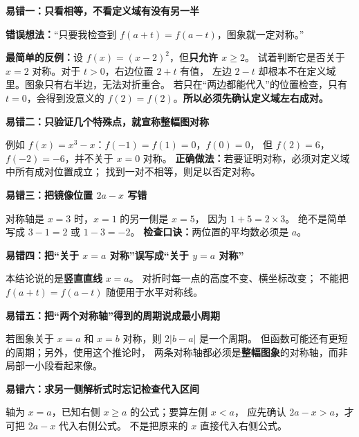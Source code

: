 \clearpage
\begin{trapbox}
  \textbf{\textcolor{CTrap}{易错一：只看相等，不看定义域有没有另一半}}


  \textbf{错误想法：}“只要我检查到 $f(a+t)=f(a-t)$，图象就一定对称。”

  \textbf{最简单的反例：}设 $f(x)=(x-2)^2$，但\textbf{只允许 $x\ge2$}。
  试着判断它是否关于 $x=2$ 对称。对于 $t>0$，右边位置 $2+t$ 有值，
  左边 $2-t$ 却根本不在定义域里。图象只有右半边，无法对折重合。
  若只在“两边都能代入”的位置检查，只有 $t=0$，会得到没意义的
  $f(2)=f(2)$。\textbf{所以必须先确认定义域左右成对。}

  \medskip
  
\end{trapbox}
\clearpage
\begin{trapbox}
\textbf{\textcolor{CTrap}{易错二：只验证几个特殊点，就宣称整幅图对称}}


  例如 $f(x)=x^3-x$：$f(-1)=f(1)=0$，$f(0)=0$，
  但 $f(2)=6$，$f(-2)=-6$，并不关于 $x=0$ 对称。
  \textbf{正确做法：}若要证明对称，必须对定义域中所有成对位置成立；
  找到一对不相等，则足以否定对称。

  \medskip
  
\end{trapbox}
\clearpage
\begin{trapbox}
\textbf{\textcolor{CTrap}{易错三：把镜像位置 $2a-x$ 写错}}


  对称轴是 $x=3$ 时，$x=1$ 的另一侧是 $x=5$，
  因为 $1+5=2\times3$。
  绝不是简单写成 $3-1=2$ 或 $1-3=-2$。
  \textbf{检查口诀：}两位置的平均数必须是 $a$。

  \medskip
  
\end{trapbox}
\clearpage
\begin{trapbox}
\textbf{\textcolor{CTrap}{易错四：把“关于 $x=a$ 对称”误写成“关于 $y=a$ 对称”}}


  本结论说的是\textbf{竖直直线} $x=a$。
  对折时每一点的高度不变、横坐标改变；
  不能把 $f(a+t)=f(a-t)$ 随便用于水平对称线。

  \medskip
  
\end{trapbox}
\clearpage
\begin{trapbox}
\textbf{\textcolor{CTrap}{易错五：把“两个对称轴”得到的周期说成最小周期}}


  若图象关于 $x=a$ 和 $x=b$ 对称，则 $2|b-a|$ 是一个周期。
  但函数可能还有更短的周期；另外，使用这个推论时，
  两条对称轴都必须是\textbf{整幅图象}的对称轴，而非局部一小段看起来像。

  \medskip
  
\end{trapbox}
\clearpage
\begin{trapbox}
\textbf{\textcolor{CTrap}{易错六：求另一侧解析式时忘记检查代入区间}}


  轴为 $x=a$，已知右侧 $x\ge a$ 的公式；要算左侧 $x<a$，
  应先确认 $2a-x>a$，才可把 $2a-x$ 代入右侧公式。
  不是把原来的 $x$ 直接代入右侧公式。
\end{trapbox}
